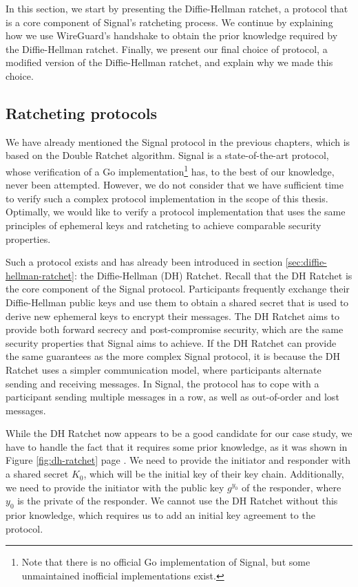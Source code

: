 In this section, we start by presenting the Diffie-Hellman ratchet, a protocol that is a core component of Signal's ratcheting process.
We continue by explaining how we use WireGuard's handshake to obtain the prior knowledge required by the Diffie-Hellman ratchet.
Finally, we present our final choice of protocol, a modified version of the Diffie-Hellman ratchet, and explain why we made this choice.

\subsection{Ratcheting protocols}
\label{sec:ratcheting-protocols}

We have already mentioned the Signal protocol in the previous chapters, which is based on the Double Ratchet algorithm.
Signal is a state-of-the-art protocol, whose verification of a Go implementation\footnote{Note that there is no official Go implementation of Signal, but some unmaintained inofficial implementations exist.} has, to the best of our knowledge, never been attempted.
However, we do not consider that we have sufficient time to verify such a complex protocol implementation in the scope of this thesis.
Optimally, we would like to verify a protocol implementation that uses the same principles of ephemeral keys and ratcheting to achieve comparable security properties.

Such a protocol exists and has already been introduced in section \ref{sec:diffie-hellman-ratchet}: the Diffie-Hellman (DH) Ratchet.
Recall that the DH Ratchet is the core component of the Signal protocol. Participants frequently exchange their Diffie-Hellman public keys and use them to obtain a shared secret that is used to derive new ephemeral keys to encrypt their messages.
The DH Ratchet aims to provide both forward secrecy and post-compromise security, which are the same security properties that Signal aims to achieve.
If the DH Ratchet can provide the same guarantees as the more complex Signal protocol, it is because the DH Ratchet uses a simpler communication model, where participants alternate sending and receiving messages.
In Signal, the protocol has to cope with a participant sending multiple messages in a row, as well as out-of-order and lost messages.

While the DH Ratchet now appears to be a good candidate for our case study, we have to handle the fact that it requires some prior knowledge, as it was shown in Figure \ref{fig:dh-ratchet} page \pageref{fig:dh-ratchet}.
We need to provide the initiator and responder with a shared secret $K_0$, which will be the initial key of their key chain.
Additionally, we need to provide the initiator with the public key $g^{y_0}$ of the responder, where $y_0$ is the private of the responder.
We cannot use the DH Ratchet without this prior knowledge, which requires us to add an initial key agreement to the protocol.

